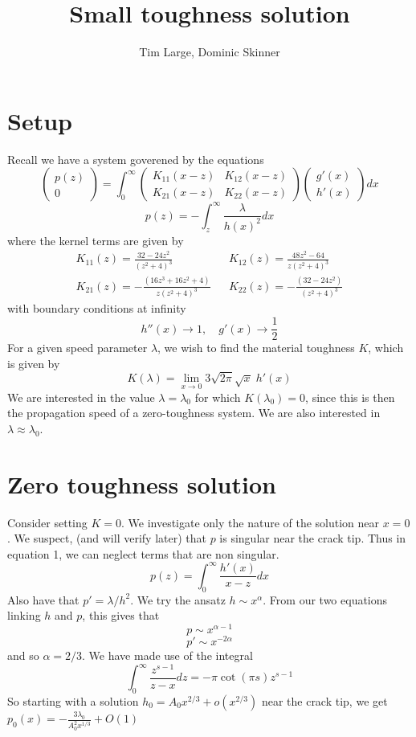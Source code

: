 \documentclass{article}
\begin{document}
\title{Small toughness solution}
\author{Tim Large, Dominic Skinner}
\maketitle
\section{Setup}
Recall we have a system goverened by the equations
\begin{equation} \left( \begin{array}{c} p(z) \\ 0 \end{array} \right) =
\int_0^{\infty} \left( \begin{array}{cc} K_{11}(x-z) & K_{12}(x-z) \\
 K_{21}(x-z) & K_{22}(x-z) \end{array} \right)
 \left( \begin{array}{c} g'(x) \\ h'(x) \end{array} \right) dx
\end{equation}
\begin{equation}
p(z) = - \int_z^{\infty} \frac{\lambda}{h(x)^2} dx
\end{equation}
where the kernel terms are given by
\[ \begin{array}{lcl}
\displaystyle K_{11}(z) = \frac{32-24z^2}{(z^2+4)^3} & &
\displaystyle K_{12}(z) = \frac{48z^2-64}{z(z^2+4)^3} \\[19pt]
\displaystyle K_{21}(z) = -\frac{(16z^3+16z^2+4)}{z(z^2+4)^3} & &
\displaystyle K_{22}(z) = -\frac{(32-24z^2)}{(z^2+4)^3} 
\end{array} \] 
with boundary conditions at infinity
\[ h''(x) \to 1, \quad g'(x) \to \frac{1}{2} \]
For a given speed parameter $\lambda$, we wish to find the material toughness
$K$, which is given by
\[ K(\lambda) = \lim_{x\to 0} 3 \sqrt{2\pi} \sqrt{x} \;h'(x) \]
We are interested in the value $\lambda = \lambda_0$ for which 
$K(\lambda_0)=0$, since this is then the propagation speed of a zero-toughness
system. We are also interested in $\lambda \approx \lambda_0$.
%
\section{Zero toughness solution}
% 
Consider setting $K=0$. We investigate only the nature of the solution near
$x=0$. We suspect, (and will verify later) that $p$ is singular near the crack
tip. Thus in equation 1, we can neglect terms that are non singular. 
\[ p(z) = \int_0^{\infty} \frac{h'(x)}{x-z} dx \]
Also have that $p' = \lambda/h^2$. We try the ansatz $h \sim x^{\alpha}$. From
our two equations linking $h$ and $p$, this gives that
\[ p \sim x^{\alpha-1} \]
\[ p' \sim x^{-2\alpha} \]
and so $\alpha = 2/3$. We have made use of the integral
\[ \int_0^\infty \frac{z^{s-1}}{z-x}dz = -\pi \cot (\pi s)z^{s-1} \]
So starting with a solution $h_0 = A_0 x^{2/3} + o(x^{2/3})$ near the
crack tip, we get $p_0(x) = -\frac{3\lambda_0}{A_0^2x^{1/3}} + O(1)$
\end{document}
